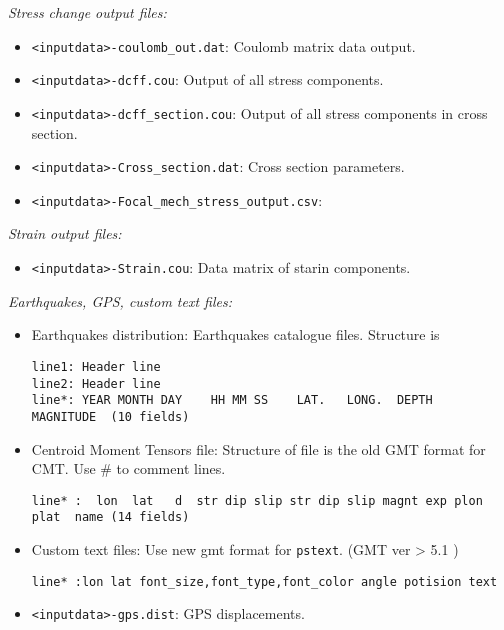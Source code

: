 \emph{Stress change output files:}

\begin{itemize}
\item
  \texttt{\textless{}inputdata\textgreater{}-coulomb\_out.dat}: Coulomb
  matrix data output.
\item
  \texttt{\textless{}inputdata\textgreater{}-dcff.cou}: Output of all
  stress components.
\item
  \texttt{\textless{}inputdata\textgreater{}-dcff\_section.cou}: Output
  of all stress components in cross section.
\item
  \texttt{\textless{}inputdata\textgreater{}-Cross\_section.dat}: Cross
  section parameters.
\item
  \texttt{\textless{}inputdata\textgreater{}-Focal\_mech\_stress\_output.csv}:
\end{itemize}

\emph{Strain output files:}

\begin{itemize}

\item
  \texttt{\textless{}inputdata\textgreater{}-Strain.cou}: Data matrix of
  starin components.
\end{itemize}

\emph{Earthquakes, GPS, custom text files:}

\begin{itemize}
\item
  Earthquakes distribution: Earthquakes catalogue files. Structure is

\begin{verbatim}
line1: Header line
line2: Header line
line*: YEAR MONTH DAY    HH MM SS    LAT.   LONG.  DEPTH    MAGNITUDE  (10 fields)
\end{verbatim}
\item
  Centroid Moment Tensors file: Structure of file is the old GMT format
  for CMT. Use \# to comment lines.

\begin{verbatim}
line* :  lon  lat   d  str dip slip str dip slip magnt exp plon  plat  name (14 fields)
\end{verbatim}
\item
  Custom text files: Use new gmt format for \texttt{pstext}. (GMT ver
  \textgreater{} 5.1 )

\begin{verbatim}
line* :lon lat font_size,font_type,font_color angle potision text
\end{verbatim}
\item
  \texttt{\textless{}inputdata\textgreater{}-gps.dist}: GPS
  displacements.
\end{itemize}

